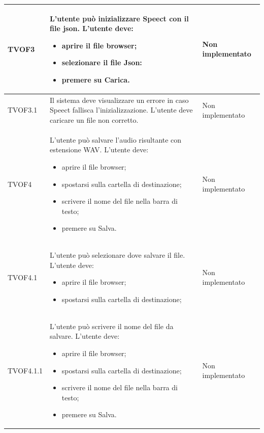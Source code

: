 \documentclass[openany,12pt,a4paper]{report}
\begin{document}
\begin{longtable}{| p{3cm} |p{8cm} | p{2.5cm} |}
	\newline TVOF3&		
	\newline L'utente può inizializzare Speect con il file json. L'utente deve:
	\begin{itemize}
		\item aprire il file browser;
		\item selezionare il file Json:
		\item premere su Carica.
	\end{itemize}&
	\newline Non implementato
	\\[1em]	
	\hline	
	
	\newline TVOF3.1&
	\newline Il sistema deve visualizzare un errore in caso Speect fallisca l'inizializzazione. L'utente deve caricare un file non corretto.&
	\newline Non implementato
	\\[1em]		
	\hline
	
	\newline TVOF4&
	\newline L'utente può salvare l'audio risultante con estensione WAV. L'utente deve:
	\begin{itemize}
		\item aprire il file browser;
		\item spostarsi sulla cartella di destinazione;
		\item scrivere il nome del file nella barra di testo;
		\item premere su Salva.
	\end{itemize}&
	\newline Non implementato
	\\[1em]
	\hline
	
	\newline TVOF4.1&
	\newline L'utente può selezionare dove salvare il file. L'utente deve:
	\begin{itemize}
		\item aprire il file browser;
		\item spostarsi sulla cartella di destinazione;
	\end{itemize}&
	\newline Non implementato
	\\[1em]
	
	\hline	
	\newline TVOF4.1.1&
	\newline L'utente può scrivere il nome del file da salvare. L'utente deve:
	\begin{itemize}
		\item aprire il file browser;
		\item spostarsi sulla cartella di destinazione;
		\item scrivere il nome del file nella barra di testo;
		\item premere su Salva.
	\end{itemize}&
	\newline Non implementato
	\\[1em]
	

\end{longtable}
\end{document}
